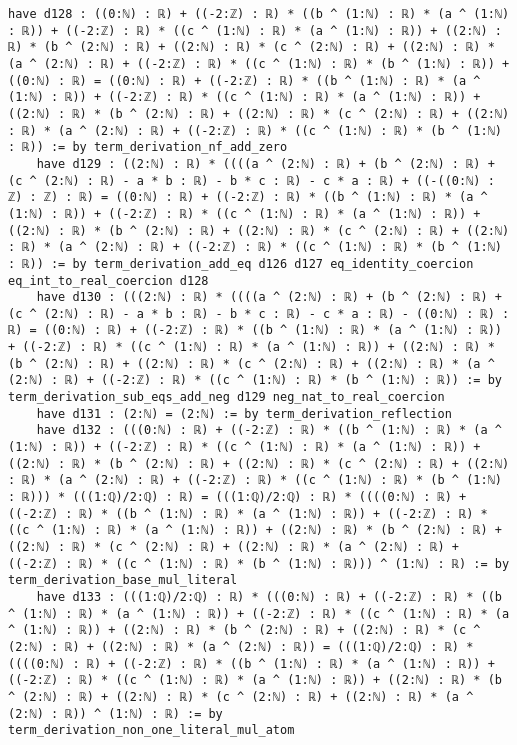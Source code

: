 \documentclass{article}
\begin{document}
\begin{tcolorbox}[colback=white!10, width=\linewidth]
\begin{lstlisting}[language=Lean4]
    have d128 : ((0:ℕ) : ℝ) + ((-2:ℤ) : ℝ) * ((b ^ (1:ℕ) : ℝ) * (a ^ (1:ℕ) : ℝ)) + ((-2:ℤ) : ℝ) * ((c ^ (1:ℕ) : ℝ) * (a ^ (1:ℕ) : ℝ)) + ((2:ℕ) : ℝ) * (b ^ (2:ℕ) : ℝ) + ((2:ℕ) : ℝ) * (c ^ (2:ℕ) : ℝ) + ((2:ℕ) : ℝ) * (a ^ (2:ℕ) : ℝ) + ((-2:ℤ) : ℝ) * ((c ^ (1:ℕ) : ℝ) * (b ^ (1:ℕ) : ℝ)) + ((0:ℕ) : ℝ) = ((0:ℕ) : ℝ) + ((-2:ℤ) : ℝ) * ((b ^ (1:ℕ) : ℝ) * (a ^ (1:ℕ) : ℝ)) + ((-2:ℤ) : ℝ) * ((c ^ (1:ℕ) : ℝ) * (a ^ (1:ℕ) : ℝ)) + ((2:ℕ) : ℝ) * (b ^ (2:ℕ) : ℝ) + ((2:ℕ) : ℝ) * (c ^ (2:ℕ) : ℝ) + ((2:ℕ) : ℝ) * (a ^ (2:ℕ) : ℝ) + ((-2:ℤ) : ℝ) * ((c ^ (1:ℕ) : ℝ) * (b ^ (1:ℕ) : ℝ)) := by term_derivation_nf_add_zero
    have d129 : ((2:ℕ) : ℝ) * ((((a ^ (2:ℕ) : ℝ) + (b ^ (2:ℕ) : ℝ) + (c ^ (2:ℕ) : ℝ) - a * b : ℝ) - b * c : ℝ) - c * a : ℝ) + ((-((0:ℕ) : ℤ) : ℤ) : ℝ) = ((0:ℕ) : ℝ) + ((-2:ℤ) : ℝ) * ((b ^ (1:ℕ) : ℝ) * (a ^ (1:ℕ) : ℝ)) + ((-2:ℤ) : ℝ) * ((c ^ (1:ℕ) : ℝ) * (a ^ (1:ℕ) : ℝ)) + ((2:ℕ) : ℝ) * (b ^ (2:ℕ) : ℝ) + ((2:ℕ) : ℝ) * (c ^ (2:ℕ) : ℝ) + ((2:ℕ) : ℝ) * (a ^ (2:ℕ) : ℝ) + ((-2:ℤ) : ℝ) * ((c ^ (1:ℕ) : ℝ) * (b ^ (1:ℕ) : ℝ)) := by term_derivation_add_eq d126 d127 eq_identity_coercion eq_int_to_real_coercion d128
    have d130 : (((2:ℕ) : ℝ) * ((((a ^ (2:ℕ) : ℝ) + (b ^ (2:ℕ) : ℝ) + (c ^ (2:ℕ) : ℝ) - a * b : ℝ) - b * c : ℝ) - c * a : ℝ) - ((0:ℕ) : ℝ) : ℝ) = ((0:ℕ) : ℝ) + ((-2:ℤ) : ℝ) * ((b ^ (1:ℕ) : ℝ) * (a ^ (1:ℕ) : ℝ)) + ((-2:ℤ) : ℝ) * ((c ^ (1:ℕ) : ℝ) * (a ^ (1:ℕ) : ℝ)) + ((2:ℕ) : ℝ) * (b ^ (2:ℕ) : ℝ) + ((2:ℕ) : ℝ) * (c ^ (2:ℕ) : ℝ) + ((2:ℕ) : ℝ) * (a ^ (2:ℕ) : ℝ) + ((-2:ℤ) : ℝ) * ((c ^ (1:ℕ) : ℝ) * (b ^ (1:ℕ) : ℝ)) := by term_derivation_sub_eqs_add_neg d129 neg_nat_to_real_coercion
    have d131 : (2:ℕ) = (2:ℕ) := by term_derivation_reflection
    have d132 : (((0:ℕ) : ℝ) + ((-2:ℤ) : ℝ) * ((b ^ (1:ℕ) : ℝ) * (a ^ (1:ℕ) : ℝ)) + ((-2:ℤ) : ℝ) * ((c ^ (1:ℕ) : ℝ) * (a ^ (1:ℕ) : ℝ)) + ((2:ℕ) : ℝ) * (b ^ (2:ℕ) : ℝ) + ((2:ℕ) : ℝ) * (c ^ (2:ℕ) : ℝ) + ((2:ℕ) : ℝ) * (a ^ (2:ℕ) : ℝ) + ((-2:ℤ) : ℝ) * ((c ^ (1:ℕ) : ℝ) * (b ^ (1:ℕ) : ℝ))) * (((1:ℚ)/2:ℚ) : ℝ) = (((1:ℚ)/2:ℚ) : ℝ) * ((((0:ℕ) : ℝ) + ((-2:ℤ) : ℝ) * ((b ^ (1:ℕ) : ℝ) * (a ^ (1:ℕ) : ℝ)) + ((-2:ℤ) : ℝ) * ((c ^ (1:ℕ) : ℝ) * (a ^ (1:ℕ) : ℝ)) + ((2:ℕ) : ℝ) * (b ^ (2:ℕ) : ℝ) + ((2:ℕ) : ℝ) * (c ^ (2:ℕ) : ℝ) + ((2:ℕ) : ℝ) * (a ^ (2:ℕ) : ℝ) + ((-2:ℤ) : ℝ) * ((c ^ (1:ℕ) : ℝ) * (b ^ (1:ℕ) : ℝ))) ^ (1:ℕ) : ℝ) := by term_derivation_base_mul_literal
    have d133 : (((1:ℚ)/2:ℚ) : ℝ) * (((0:ℕ) : ℝ) + ((-2:ℤ) : ℝ) * ((b ^ (1:ℕ) : ℝ) * (a ^ (1:ℕ) : ℝ)) + ((-2:ℤ) : ℝ) * ((c ^ (1:ℕ) : ℝ) * (a ^ (1:ℕ) : ℝ)) + ((2:ℕ) : ℝ) * (b ^ (2:ℕ) : ℝ) + ((2:ℕ) : ℝ) * (c ^ (2:ℕ) : ℝ) + ((2:ℕ) : ℝ) * (a ^ (2:ℕ) : ℝ)) = (((1:ℚ)/2:ℚ) : ℝ) * ((((0:ℕ) : ℝ) + ((-2:ℤ) : ℝ) * ((b ^ (1:ℕ) : ℝ) * (a ^ (1:ℕ) : ℝ)) + ((-2:ℤ) : ℝ) * ((c ^ (1:ℕ) : ℝ) * (a ^ (1:ℕ) : ℝ)) + ((2:ℕ) : ℝ) * (b ^ (2:ℕ) : ℝ) + ((2:ℕ) : ℝ) * (c ^ (2:ℕ) : ℝ) + ((2:ℕ) : ℝ) * (a ^ (2:ℕ) : ℝ)) ^ (1:ℕ) : ℝ) := by term_derivation_non_one_literal_mul_atom

\end{lstlisting}
\end{tcolorbox}
\end{document}
